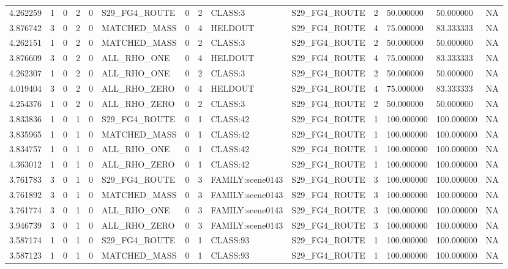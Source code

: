 \begin{tabular}{llllllllllllll}
4.262259 & 1 & 0 & 2 & 0 & S29\_FG4\_ROUTE & 0 & 2 & CLASS:3 & S29\_FG4\_ROUTE & 2 & 50.000000 & 50.000000 & NA \\
3.876742 & 3 & 0 & 2 & 0 & MATCHED\_MASS & 0 & 4 & HELDOUT & S29\_FG4\_ROUTE & 4 & 75.000000 & 83.333333 & NA \\
4.262151 & 1 & 0 & 2 & 0 & MATCHED\_MASS & 0 & 2 & CLASS:3 & S29\_FG4\_ROUTE & 2 & 50.000000 & 50.000000 & NA \\
3.876609 & 3 & 0 & 2 & 0 & ALL\_RHO\_ONE & 0 & 4 & HELDOUT & S29\_FG4\_ROUTE & 4 & 75.000000 & 83.333333 & NA \\
4.262307 & 1 & 0 & 2 & 0 & ALL\_RHO\_ONE & 0 & 2 & CLASS:3 & S29\_FG4\_ROUTE & 2 & 50.000000 & 50.000000 & NA \\
4.019404 & 3 & 0 & 2 & 0 & ALL\_RHO\_ZERO & 0 & 4 & HELDOUT & S29\_FG4\_ROUTE & 4 & 75.000000 & 83.333333 & NA \\
4.254376 & 1 & 0 & 2 & 0 & ALL\_RHO\_ZERO & 0 & 2 & CLASS:3 & S29\_FG4\_ROUTE & 2 & 50.000000 & 50.000000 & NA \\
3.833836 & 1 & 0 & 1 & 0 & S29\_FG4\_ROUTE & 0 & 1 & CLASS:42 & S29\_FG4\_ROUTE & 1 & 100.000000 & 100.000000 & NA \\
3.835965 & 1 & 0 & 1 & 0 & MATCHED\_MASS & 0 & 1 & CLASS:42 & S29\_FG4\_ROUTE & 1 & 100.000000 & 100.000000 & NA \\
3.834757 & 1 & 0 & 1 & 0 & ALL\_RHO\_ONE & 0 & 1 & CLASS:42 & S29\_FG4\_ROUTE & 1 & 100.000000 & 100.000000 & NA \\
4.363012 & 1 & 0 & 1 & 0 & ALL\_RHO\_ZERO & 0 & 1 & CLASS:42 & S29\_FG4\_ROUTE & 1 & 100.000000 & 100.000000 & NA \\
3.761783 & 3 & 0 & 1 & 0 & S29\_FG4\_ROUTE & 0 & 3 & FAMILY:scene0143 & S29\_FG4\_ROUTE & 3 & 100.000000 & 100.000000 & NA \\
3.761892 & 3 & 0 & 1 & 0 & MATCHED\_MASS & 0 & 3 & FAMILY:scene0143 & S29\_FG4\_ROUTE & 3 & 100.000000 & 100.000000 & NA \\
3.761774 & 3 & 0 & 1 & 0 & ALL\_RHO\_ONE & 0 & 3 & FAMILY:scene0143 & S29\_FG4\_ROUTE & 3 & 100.000000 & 100.000000 & NA \\
3.946739 & 3 & 0 & 1 & 0 & ALL\_RHO\_ZERO & 0 & 3 & FAMILY:scene0143 & S29\_FG4\_ROUTE & 3 & 100.000000 & 100.000000 & NA \\
3.587174 & 1 & 0 & 1 & 0 & S29\_FG4\_ROUTE & 0 & 1 & CLASS:93 & S29\_FG4\_ROUTE & 1 & 100.000000 & 100.000000 & NA \\
3.587123 & 1 & 0 & 1 & 0 & MATCHED\_MASS & 0 & 1 & CLASS:93 & S29\_FG4\_ROUTE & 1 & 100.000000 & 100.000000 & NA \\

\end{tabular}
